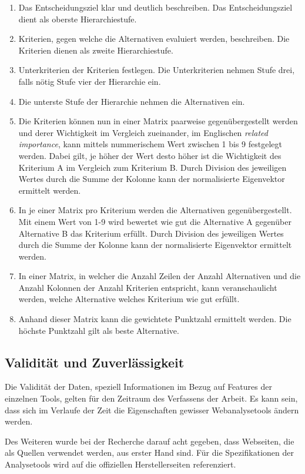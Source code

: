 \begin{enumerate}
  \item Das Entscheidungsziel klar und deutlich beschreiben. Das Entscheidungsziel dient als oberste Hierarchiestufe.
  \item Kriterien, gegen welche die Alternativen evaluiert werden, beschreiben. Die Kriterien dienen als zweite Hierarchiestufe.
  \item Unterkriterien der Kriterien festlegen. Die Unterkriterien nehmen Stufe drei, falls nötig Stufe vier der Hierarchie ein.
  \item Die unterste Stufe der Hierarchie nehmen die Alternativen ein.
  \item Die Kriterien können nun in einer Matrix paarweise gegenübergestellt werden und derer Wichtigkeit im Vergleich zueinander, im Englischen \textit{related importance}, kann mittels nummerischem Wert zwischen 1 bis 9 festgelegt werden. Dabei gilt, je höher der Wert desto höher ist die Wichtigkeit des Kriterium A im Vergleich zum Kriterium B. Durch Division des jeweiligen Wertes durch die Summe der Kolonne kann der normalisierte Eigenvektor ermittelt werden.
  \item In je einer Matrix pro Kriterium werden die Alternativen gegenübergestellt. Mit einem Wert von 1-9 wird bewertet wie gut die Alternative A gegenüber Alternative B das Kriterium erfüllt. Durch Division des jeweiligen Wertes durch die Summe der Kolonne kann der normalisierte Eigenvektor ermittelt werden.
  \item In einer Matrix, in welcher die Anzahl Zeilen der Anzahl Alternativen und die Anzahl Kolonnen der Anzahl Kriterien entspricht, kann veranschaulicht werden, welche Alternative welches Kriterium wie gut erfüllt.
  \item Anhand dieser Matrix kann die gewichtete Punktzahl ermittelt werden. Die höchste Punktzahl gilt als beste Alternative.
\end{enumerate}

\subsection{Validität und Zuverlässigkeit}
Die Validität der Daten, speziell Informationen im Bezug auf Features der einzelnen Tools, gelten für den Zeitraum des Verfassens der Arbeit. Es kann sein, dass sich im Verlaufe der Zeit die Eigenschaften gewisser Webanalysetools ändern werden. 

Des Weiteren wurde bei der Recherche darauf acht gegeben, dass Webseiten, die als Quellen verwendet werden, aus erster Hand sind. Für die Spezifikationen der Analysetools wird auf die offiziellen Herstellerseiten referenziert.


